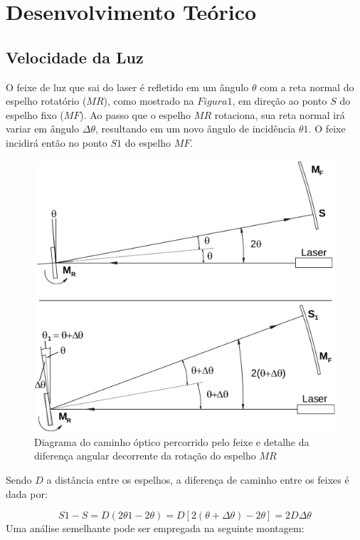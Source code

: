 \section{Desenvolvimento Teórico}
\subsection{Velocidade da Luz}
O feixe de luz que sai do laser é refletido em um ângulo $\theta$ com a reta normal do espelho rotatório ($MR$), como mostrado na $Figura 1$, em direção ao ponto $S$ do espelho fixo ($MF$). Ao passo que o espelho $MR$ rotaciona, sua reta normal irá variar em ângulo  $\Delta \theta$, resultando em um novo ângulo de incidência $\theta1$. O feixe incidirá então no ponto $S1$ do espelho $MF$.
\begin{figure}[!ht]
	\centering
	\includegraphics[scale=0.4]{2.png}
	\caption{Diagrama do caminho óptico percorrido pelo feixe e detalhe da diferença angular decorrente da rotação do espelho $MR$}
\end{figure} 
Sendo $D$ a distância entre os espelhos, a diferença de caminho entre os feixes é dada por:

\begin{equation}
	S1-S = D(2\theta1 - 2\theta)=D[2(\theta+\Delta\theta)-2\theta]= 2D\Delta		\theta
\end{equation}
Uma análise semelhante pode ser empregada na seguinte montagem:

